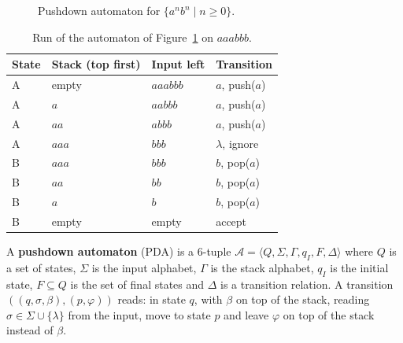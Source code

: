 \begin{figure}[h]
\centering
{}
\caption{Pushdown automaton for $\{a^n b^n \mid n \ge 0\}$.}
\label{fig:anbn}
\end{figure}

\begin{table}[h]
\centering
\small
\begin{tabular}{l l l l}
  \toprule
  State & Stack (top first) & Input left & Transition \\
  \midrule
  A & empty     & $aaabbb$ & $a$, push($a$) \\
  A & $a$       & $aabbb$  & $a$, push($a$) \\
  A & $aa$      & $abbb$   & $a$, push($a$) \\
  A & $aaa$     & $bbb$    & $\lambda$, ignore \\
  B & $aaa$     & $bbb$    & $b$, pop($a$) \\
  B & $aa$      & $bb$     & $b$, pop($a$) \\
  B & $a$       & $b$      & $b$, pop($a$) \\
  B & empty     & empty    & accept \\
  \bottomrule
\end{tabular}
\caption{Run of the automaton of Figure~\ref{fig:anbn} on $aaabbb$.}
\label{tab:anbn}
\end{table}

\begin{definition}
A \textbf{pushdown automaton} (PDA) is a 6-tuple $\mathcal{A} = \langle Q, \Sigma,
\Gamma, q_I, F, \Delta \rangle$ where $Q$ is a set of states, $\Sigma$ is the input
alphabet, $\Gamma$ is the stack alphabet, $q_I$ is the initial state, $F
\subseteq Q$ is the set of final states and $\Delta$ is a transition relation.
A transition $((q, \sigma, \beta), (p, \varphi))$ reads: in state $q$, with
$\beta$ on top of the stack, reading $\sigma \in \Sigma \cup \{\lambda\}$ from the
input, move to state $p$ and leave $\varphi$ on top of the stack instead of
$\beta$.
\end{definition}

